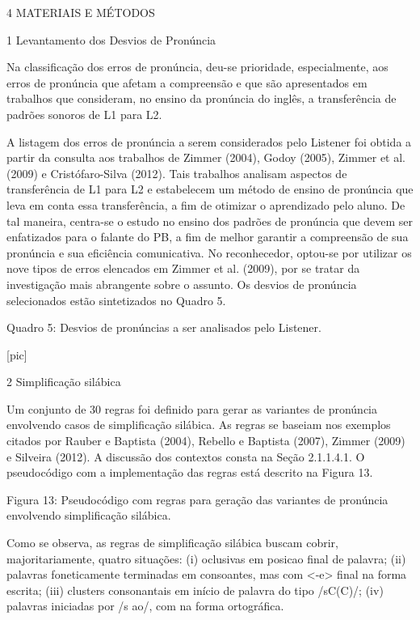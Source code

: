 4 MATERIAIS E M\'ETODOS

1 Levantamento dos Desvios de Pron\'uncia

Na classifica\c{c}\~ao dos erros de pron\'uncia, deu-se prioridade,
especialmente, aos erros de pron\'uncia que afetam a compreens\~ao e que s\~ao
apresentados em trabalhos que consideram, no ensino da pron\'uncia do
ingl\^es, a transfer\^encia de padr\~oes sonoros de L1 para L2.

A listagem dos erros de pron\'uncia a serem considerados pelo Listener foi
obtida a partir da consulta aos trabalhos de Zimmer (2004), Godoy
(2005), Zimmer et al. (2009) e Crist\'ofaro-Silva (2012). Tais trabalhos
analisam aspectos de transfer\^encia de L1 para L2 e estabelecem um m\'etodo
de ensino de pron\'uncia que leva em conta essa transfer\^encia, a fim de
otimizar o aprendizado pelo aluno. De tal maneira, centra-se o estudo no
ensino dos padr\~oes de pron\'uncia que devem ser enfatizados para o falante
do PB, a fim de melhor garantir a compreens\~ao de sua pron\'uncia e sua
efici\^encia comunicativa. No reconhecedor, optou-se por utilizar os nove
tipos de erros elencados em Zimmer et al. (2009), por se tratar da
investiga\c{c}\~ao mais abrangente sobre o assunto. Os desvios de pron\'uncia
selecionados est\~ao sintetizados no Quadro 5.

   Quadro 5: Desvios de pron\'uncias a ser analisados pelo Listener.

                                [pic]

2 Simplifica\c{c}\~ao sil\'abica

Um conjunto de 30 regras foi definido para gerar as variantes de
pron\'uncia envolvendo casos de simplifica\c{c}\~ao sil\'abica. As regras se
baseiam nos exemplos citados por Rauber e Baptista (2004), Rebello e
Baptista (2007), Zimmer (2009) e Silveira (2012). A discuss\~ao dos
contextos consta na Se\c{c}\~ao 2.1.1.4.1. O pseudoc\'odigo com a implementa\c{c}\~ao
das regras est\'a descrito na Figura 13.

Figura 13: Pseudoc\'odigo com regras para gera\c{c}\~ao das variantes de
pron\'uncia envolvendo simplifica\c{c}\~ao sil\'abica.

Como se observa, as regras de simplifica\c{c}\~ao sil\'abica buscam cobrir,
majoritariamente, quatro situa\c{c}\~oes: (i) oclusivas em posicao final de
palavra; (ii) palavras foneticamente terminadas em consoantes, mas com
\textless{}-e\textgreater{} final na forma escrita; (iii) clusters
consonantais em in\'icio de palavra do tipo /sC(C)/; (iv) palavras
iniciadas por /s ao/, com na forma ortogr\'afica.


